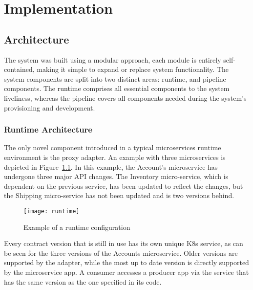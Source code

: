 
%

\chapter{Implementation}
\label{cha:implementation}

\section{Architecture} %
\label{sec:architecture}
The system was built using a modular approach,
each module is entirely self-contained, making it simple to expand or replace system functionality.
The system components are split into two distinct areas: runtime, and pipeline components.
The runtime comprises all essential components to the system liveliness,
whereas the pipeline covers all components needed during the system's provisioning and development.

\subsection{Runtime Architecture} %
\label{sec:runtime_architecture}

The only novel component introduced in a typical microservices runtime environment is the proxy adapter.
An example with three microservices is depicted in Figure~\ref{fig:runtime}.
In this example, the Account's microservice has undergone three major API changes.
The Inventory micro-service, which is dependent on the previous service, has been updated to reflect the changes, but the Shipping micro-service has not been updated and is two versions behind.

\begin{figure}[htbp]
    \centering
    \texttt{[image: runtime]}
    \caption{Example of a runtime configuration}
    \label{fig:runtime}
\end{figure}

Every contract version that is still in use has its own unique K8s service, as can be seen for the three versions of the Accounts microservice.
Older versions are supported by the adapter, while the most up to date version is directly supported by the microservice app.
A consumer accesses a producer app via the service that has the same version as the one specified in its code.

